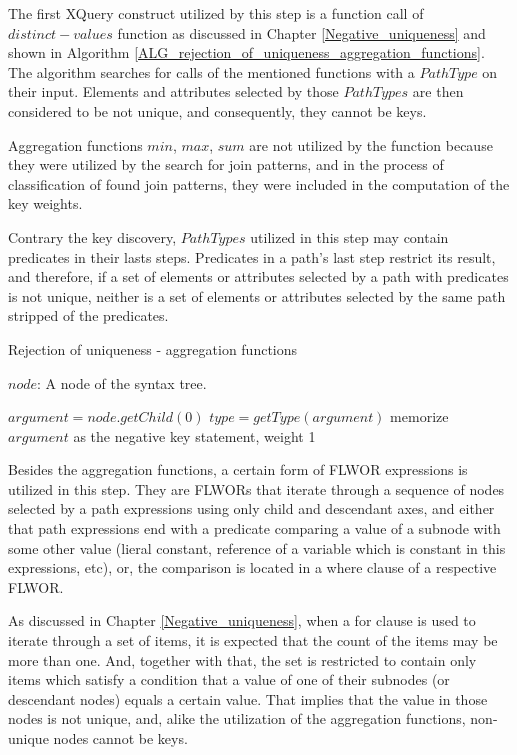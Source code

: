 The first XQuery construct utilized by this step is a function call of $distinct-values$ function as discussed in Chapter \ref{Negative_uniqueness} and shown in Algorithm \ref{ALG_rejection_of_uniqueness_aggregation_functions}. The algorithm searches for calls of the mentioned functions with a $PathType$ on their input. Elements and attributes selected by those $PathTypes$ are then considered to be not unique, and consequently, they cannot be keys.

Aggregation functions $min$, $max$, $sum$ are not utilized by the function because they were utilized by the search for join patterns, and in the process of classification of found join patterns, they were included in the computation of the key weights.

Contrary the key discovery, $PathTypes$ utilized in this step may contain predicates in their lasts steps. Predicates in a path's last step restrict its result, and therefore, if a set of elements or attributes selected by a path with predicates is not unique, neither is a set of elements or attributes selected by the same path stripped of the predicates.

\begin{algorithm}
\caption{Rejection of uniqueness - aggregation functions}
\label{ALG_rejection_of_uniqueness_aggregation_functions}
\begin{algorithmic}[1]
\REQUIRE $node$: A node of the syntax tree.

        \STATE $argument = node.getChild(0)$
        \STATE $type = getType(argument)$
            \STATE memorize $argument$ as the negative key statement, weight 1
        \ENDIF
    \ENDIF
\ENDIF
\end{algorithmic}
\end{algorithm}

Besides the aggregation functions, a certain form of FLWOR expressions is utilized in this step. They are FLWORs that iterate through a sequence of nodes selected by a path expressions using only child and descendant axes, and either that path expressions end with a predicate comparing a value of a subnode with some other value (lieral constant, reference of a variable which is constant in this expressions, etc), or, the comparison is located in a where clause of a respective FLWOR.

As discussed in Chapter \ref{Negative_uniqueness}, when a for clause is used to iterate through a set of items, it is expected that the count of the items may be more than one. And, together with that, the set is restricted to contain only items which satisfy a condition that a value of one of their subnodes (or descendant nodes) equals a certain value. That implies that the value in those nodes is not unique, and, alike the utilization of the aggregation functions, non-unique nodes cannot be keys.

